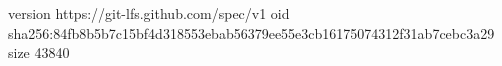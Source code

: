 version https://git-lfs.github.com/spec/v1
oid sha256:84fb8b5b7c15bf4d318553ebab56379ee55e3cb16175074312f31ab7cebc3a29
size 43840
